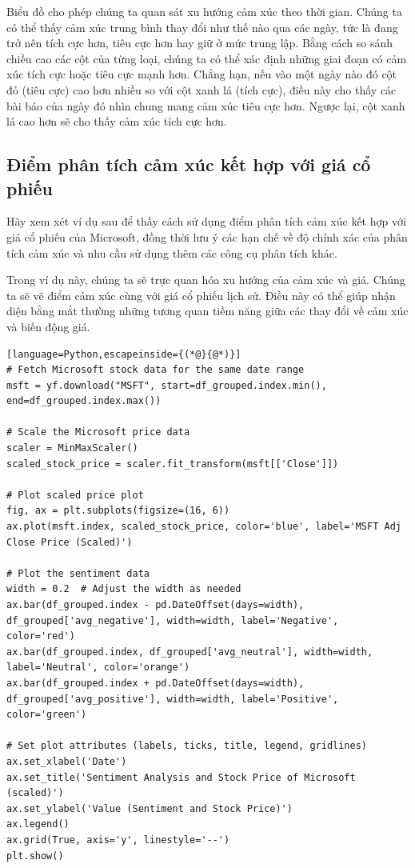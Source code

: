 Biểu đồ cho phép chúng ta quan sát xu hướng cảm xúc theo thời gian. Chúng ta có thể thấy cảm xúc trung bình thay đổi như thế nào qua các ngày, tức là đang trở nên tích cực hơn, tiêu cực hơn hay giữ ở mức trung lập. Bằng cách so sánh chiều cao các cột của từng loại, chúng ta có thể xác định những giai đoạn có cảm xúc tích cực hoặc tiêu cực mạnh hơn. Chẳng hạn, nếu vào một ngày nào đó cột đỏ (tiêu cực) cao hơn nhiều so với cột xanh lá (tích cực), điều này cho thấy các bài báo của ngày đó nhìn chung mang cảm xúc tiêu cực hơn. Ngược lại, cột xanh lá cao hơn sẽ cho thấy cảm xúc tích cực hơn.

\subsection{Điểm phân tích cảm xúc kết hợp với giá cổ phiếu}

Hãy xem xét ví dụ sau để thấy cách sử dụng điểm phân tích cảm xúc kết hợp với giá cổ phiếu của Microsoft, đồng thời lưu ý các hạn chế về độ chính xác của phân tích cảm xúc và nhu cầu sử dụng thêm các công cụ phân tích khác.

Trong ví dụ này, chúng ta sẽ trực quan hóa xu hướng của cảm xúc và giá. Chúng ta sẽ vẽ điểm cảm xúc cùng với giá cổ phiếu lịch sử. Điều này có thể giúp nhận diện bằng mắt thường những tương quan tiềm năng giữa các thay đổi về cảm xúc và biến động giá.

\begin{lstlisting}[language=Python,escapeinside={(*@}{@*)}]
# Fetch Microsoft stock data for the same date range
msft = yf.download("MSFT", start=df_grouped.index.min(), end=df_grouped.index.max())

# Scale the Microsoft price data
scaler = MinMaxScaler()
scaled_stock_price = scaler.fit_transform(msft[['Close']])

# Plot scaled price plot
fig, ax = plt.subplots(figsize=(16, 6))
ax.plot(msft.index, scaled_stock_price, color='blue', label='MSFT Adj Close Price (Scaled)')

# Plot the sentiment data
width = 0.2  # Adjust the width as needed
ax.bar(df_grouped.index - pd.DateOffset(days=width), df_grouped['avg_negative'], width=width, label='Negative', color='red')
ax.bar(df_grouped.index, df_grouped['avg_neutral'], width=width, label='Neutral', color='orange')
ax.bar(df_grouped.index + pd.DateOffset(days=width), df_grouped['avg_positive'], width=width, label='Positive', color='green')

# Set plot attributes (labels, ticks, title, legend, gridlines)
ax.set_xlabel('Date')
ax.set_title('Sentiment Analysis and Stock Price of Microsoft (scaled)')
ax.set_ylabel('Value (Sentiment and Stock Price)')
ax.legend()
ax.grid(True, axis='y', linestyle='--')
plt.show()
\end{lstlisting}

